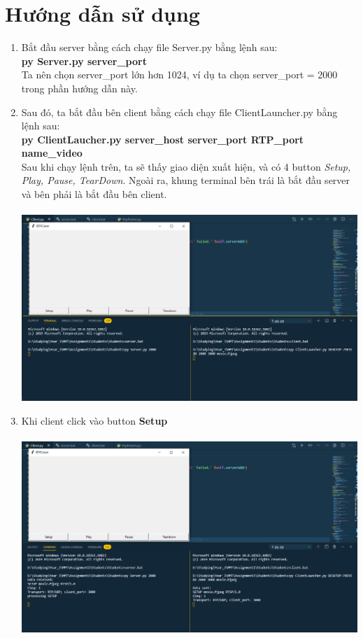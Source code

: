 \documentclass[12pt,a4paper]{article}
\begin{document}
\section{Hướng dẫn sử dụng}
\begin{enumerate}
\item Bắt đầu server bằng cách chạy file Server.py bằng lệnh sau: \\ \textbf{py Server.py server\_port}\\
Ta nên chọn server\_port lớn hơn 1024, ví dụ ta chọn server\_port = 2000 trong phần hướng dẫn này.
\item Sau đó, ta bắt đầu bên client bằng cách chạy file ClientLauncher.py bằng lệnh sau: \\
\textbf{py ClientLaucher.py server\_host server\_port RTP\_port name\_video} \\
Sau khi chạy lệnh trên, ta sẽ thấy giao diện xuất hiện, và có 4 button \textit{Setup, Play, Pause, TearDown}. Ngoài ra, khung terminal bên trái là bắt đầu server và bên phải là bắt đầu bên client. \\ \\
\includegraphics[scale=0.5]{h1.png} 
\item Khi client click vào button \textbf{Setup} \\ \\
\includegraphics[scale=0.5]{h2.png}  \\

\end{enumerate}
\end{document}
